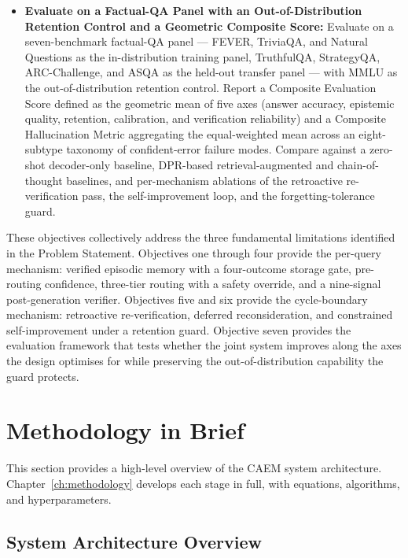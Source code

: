 \begin{itemize}
    \item \textbf{Evaluate on a Factual-QA Panel with an Out-of-Distribution Retention Control and a Geometric Composite Score:} Evaluate on a seven-benchmark factual-QA panel --- FEVER, TriviaQA, and Natural Questions as the in-distribution training panel, TruthfulQA, StrategyQA, ARC-Challenge, and ASQA as the held-out transfer panel --- with MMLU as the out-of-distribution retention control. Report a Composite Evaluation Score defined as the geometric mean of five axes (answer accuracy, epistemic quality, retention, calibration, and verification reliability) and a Composite Hallucination Metric aggregating the equal-weighted mean across an eight-subtype taxonomy of confident-error failure modes. Compare against a zero-shot decoder-only baseline, DPR-based retrieval-augmented and chain-of-thought baselines, and per-mechanism ablations of the retroactive re-verification pass, the self-improvement loop, and the forgetting-tolerance guard.
\end{itemize}

These objectives collectively address the three fundamental limitations identified in the Problem Statement. Objectives one through four provide the per-query mechanism: verified episodic memory with a four-outcome storage gate, pre-routing confidence, three-tier routing with a safety override, and a nine-signal post-generation verifier. Objectives five and six provide the cycle-boundary mechanism: retroactive re-verification, deferred reconsideration, and constrained self-improvement under a retention guard. Objective seven provides the evaluation framework that tests whether the joint system improves along the axes the design optimises for while preserving the out-of-distribution capability the guard protects.

\section{Methodology in Brief}

This section provides a high-level overview of the CAEM system architecture. Chapter~\ref{ch:methodology} develops each stage in full, with equations, algorithms, and hyperparameters.

\subsection{System Architecture Overview}

